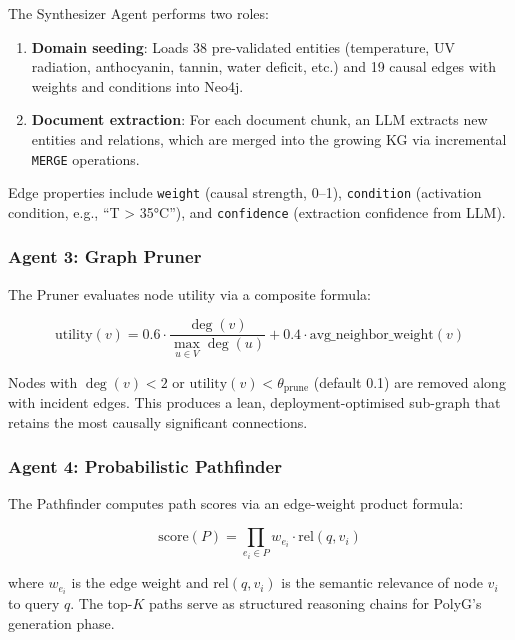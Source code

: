 \documentclass[12pt,a4paper]{article}
\begin{document}
The Synthesizer Agent performs two roles:

\begin{enumerate}
  \item \textbf{Domain seeding}: Loads 38 pre-validated entities (temperature,
    UV radiation, anthocyanin, tannin, water deficit, etc.) and 19 causal
    edges with weights and conditions into Neo4j.
  \item \textbf{Document extraction}: For each document chunk, an LLM extracts
    new entities and relations, which are merged into the growing KG via
    incremental \texttt{MERGE} operations.
\end{enumerate}

Edge properties include \texttt{weight} (causal strength, 0–1),
\texttt{condition} (activation condition, e.g., ``T > 35°C''), and
\texttt{confidence} (extraction confidence from LLM).

\subsubsection{Agent 3: Graph Pruner}

The Pruner evaluates node utility via a composite formula:

\begin{equation}
\text{utility}(v) = 0.6 \cdot \frac{\deg(v)}{\max_{u \in V} \deg(u)}
                  + 0.4 \cdot \text{avg\_neighbor\_weight}(v)
\label{eq:utility}
\end{equation}

Nodes with $\deg(v) < 2$ or $\text{utility}(v) < \theta_{\text{prune}}$
(default 0.1) are removed along with incident edges. This produces a lean,
deployment-optimised sub-graph that retains the most causally significant
connections.

\subsubsection{Agent 4: Probabilistic Pathfinder}

The Pathfinder computes path scores via an edge-weight product formula:

\begin{equation}
\text{score}(P) = \prod_{e_i \in P} w_{e_i} \cdot \text{rel}(q, v_i)
\label{eq:path_score}
\end{equation}

where $w_{e_i}$ is the edge weight and $\text{rel}(q, v_i)$ is the
semantic relevance of node $v_i$ to query $q$. The top-$K$ paths serve
as structured reasoning chains for PolyG's generation phase.
\end{document}
